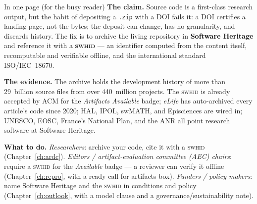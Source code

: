 \documentclass[11pt,oneside]{memoir}
\begin{document}
\begin{callout}{In one page (for the busy reader)}
\small
\textbf{The claim.} Source code is a first-class research output, but the habit of depositing a
\texttt{.zip} with a DOI fails it: a DOI certifies a landing page, not the bytes; the deposit can
change, has no granularity, and discards history. The fix is to archive the living repository in
\textbf{Software Heritage} and reference it with a \textbf{\textsc{swhid}} --- an identifier computed
from the content itself, recomputable and verifiable offline, and the international standard
ISO/IEC~18670.

\textbf{The evidence.} The archive holds the development history of more than 29~billion source
files from over 440~million projects. The \textsc{swhid} is already accepted by ACM for the
\emph{Artifacts Available} badge; \emph{eLife} has auto-archived every article's code since 2020;
HAL, IPOL, swMATH, and Episciences are wired in; UNESCO, EOSC, France's National Plan, and the ANR
all point research software at Software Heritage.

\textbf{What to do.}
\emph{Researchers}: archive your code, cite it with a \textsc{swhid} (Chapter~\ref{ch:ardc}).
\emph{Editors / artifact-evaluation committee (AEC) chairs}: require a \textsc{swhid} for the \emph{Available} badge --- a reviewer
can verify it offline (Chapter~\ref{ch:repro}, with a ready call-for-artifacts box).
\emph{Funders / policy makers}: name Software Heritage and the \textsc{swhid} in conditions and
policy (Chapter~\ref{ch:outlook}, with a model clause and a governance/sustainability note).
\end{callout}

\tableofcontents









\appendix











\printbibliography[heading=refschapter,title={References}]

\end{document}

